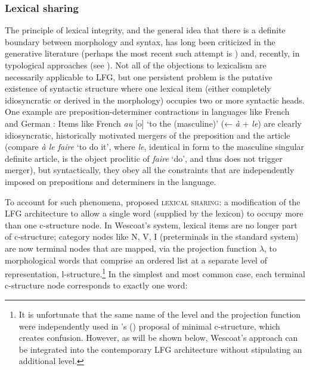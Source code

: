 \documentclass[output=paper,hidelinks]{langscibook}
\begin{document}
 \subsubsection{Lexical sharing}
 \label{sec:CoreConcepts:LexSharing}
 
 The principle of lexical integrity, and the general idea that there is a definite boundary between morphology and syntax, has long been criticized in the generative literature (perhaps the most recent such attempt is \cite{bruening2018lexicalist}) and, recently, in typological approaches (see \cite{haspelmath2011}). Not all of the objections to lexicalism are necessarily applicable to LFG, but one persistent problem is the putative existence of syntactic structure where one lexical item (either completely idiosyncratic or derived in the morphology) occupies two or more syntactic heads. One example are preposition-determiner contractions in languages like French and German \parencite{wescoat2007}: Items like French \textit{au} [o] `to the (masculine)' (← \textit{à} + \textit{le}) are clearly idiosyncratic, historically motivated mergers of the preposition and the article (compare \textit{à le faire} `to do it', where \textit{le}, identical in form to the masculine singular definite article, is the object proclitic of \textit{faire} `do', and thus does not trigger merger), but syntactically, they obey all the constraints that are independently imposed on prepositions and determiners in the language.
 
 To account for such phenomena, \textcite{wescoat2002} proposed \textsc{lexical sharing}: a modification of the LFG architecture to allow a single word (supplied by the lexicon) to occupy more than one c-structure node. In Wescoat's system, lexical items are no longer part of c-structure; category nodes like N, V, I (preterminals in the standard system) are now terminal nodes that are mapped, via the projection function $\lambda$, to morphological words that comprise an ordered list at a separate level of representation, l-structure.\footnote{It is unfortunate that the same name of the level and the projection function were independently used in \citeauthor{lovestrand-lowe2017}'s (\citeyear{lovestrand-lowe2017}) proposal of minimal c-structure, which creates confusion. However, as will be shown below, Wescoat's approach can be integrated into the contemporary LFG architecture without stipulating an additional level.} In the simplest and most common case, each terminal c-structure node corresponds to exactly one word:
 
\end{document}
